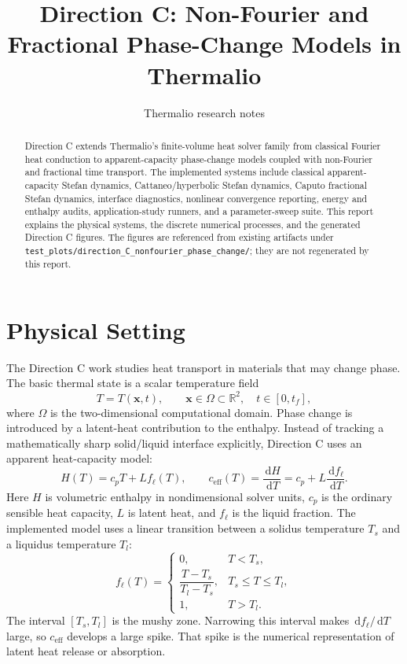 \documentclass[11pt]{article}
\title{Direction C: Non-Fourier and Fractional Phase-Change Models in Thermalio}
\author{Thermalio research notes}
\date{}
\numberwithin{equation}{section}
\newcommand{\R}{\mathbb{R}}
\newcommand{\dd}{\,\mathrm{d}}
\begin{document}
\maketitle

\begin{abstract}
Direction C extends Thermalio's finite-volume heat solver family from classical
Fourier heat conduction to apparent-capacity phase-change models coupled with
non-Fourier and fractional time transport.  The implemented systems include
classical apparent-capacity Stefan dynamics, Cattaneo/hyperbolic Stefan
dynamics, Caputo fractional Stefan dynamics, interface diagnostics, nonlinear
convergence reporting, energy and enthalpy audits, application-study runners,
and a parameter-sweep suite.  This report explains the physical systems, the
discrete numerical processes, and the generated Direction C figures.  The
figures are referenced from existing artifacts under
\texttt{test\_plots/direction\_C\_nonfourier\_phase\_change/}; they are not
regenerated by this report.
\end{abstract}

\section{Physical Setting}

The Direction C work studies heat transport in materials that may change phase.
The basic thermal state is a scalar temperature field
\begin{equation}
  T = T(\bm{x},t), \qquad \bm{x}\in\Omega\subset\R^2,\quad t\in[0,t_f],
  \label{eq:temperature-field}
\end{equation}
where $\Omega$ is the two-dimensional computational domain.  Phase change is
introduced by a latent-heat contribution to the enthalpy.  Instead of tracking a
mathematically sharp solid/liquid interface explicitly, Direction C uses an
apparent heat-capacity model:
\begin{equation}
  H(T) = c_p T + L f_\ell(T),
  \qquad
  c_{\mathrm{eff}}(T) = \frac{\dd H}{\dd T}
  = c_p + L\frac{\dd f_\ell}{\dd T}.
  \label{eq:enthalpy-capacity}
\end{equation}
Here $H$ is volumetric enthalpy in nondimensional solver units, $c_p$ is the
ordinary sensible heat capacity, $L$ is latent heat, and $f_\ell$ is the liquid
fraction.  The implemented model uses a linear transition between a solidus
temperature $T_s$ and a liquidus temperature $T_l$:
\begin{equation}
  f_\ell(T) =
  \begin{cases}
    0, & T < T_s,\\
    \dfrac{T-T_s}{T_l-T_s}, & T_s \leq T \leq T_l,\\
    1, & T > T_l.
  \end{cases}
  \label{eq:liquid-fraction}
\end{equation}
The interval $[T_s,T_l]$ is the mushy zone.  Narrowing this interval makes
$\dd f_\ell/\dd T$ large, so $c_{\mathrm{eff}}$ develops a large spike.  That
spike is the numerical representation of latent heat release or absorption.
\end{document}
